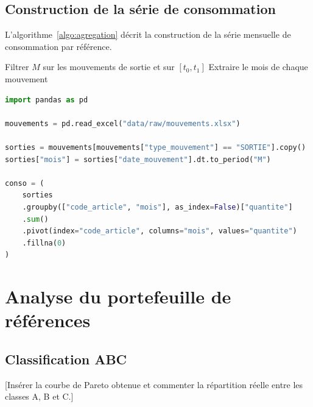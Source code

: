 \subsection{Construction de la série de consommation}

L'algorithme~\ref{algo:agregation} décrit la construction de la série
mensuelle de consommation par référence.

\begin{algorithm}[H]
  \caption{Agrégation de la consommation par référence et par mois}
  \label{algo:agregation}
  Filtrer $M$ sur les mouvements de sortie et sur $[t_{0}, t_{1}]$\;
  Extraire le mois de chaque mouvement\;
  \;
\end{algorithm}

\begin{lstlisting}[language=Python, caption={Agrégation de la consommation mensuelle}, label={lst:agregation}]
import pandas as pd

mouvements = pd.read_excel("data/raw/mouvements.xlsx")

sorties = mouvements[mouvements["type_mouvement"] == "SORTIE"].copy()
sorties["mois"] = sorties["date_mouvement"].dt.to_period("M")

conso = (
    sorties
    .groupby(["code_article", "mois"], as_index=False)["quantite"]
    .sum()
    .pivot(index="code_article", columns="mois", values="quantite")
    .fillna(0)
)
\end{lstlisting}

\section{Analyse du portefeuille de références}
\label{sec:analyse_portefeuille}

\subsection{Classification ABC}

\hspace{1cm}[Insérer la courbe de Pareto obtenue et commenter la répartition
réelle entre les classes A, B et C.]

